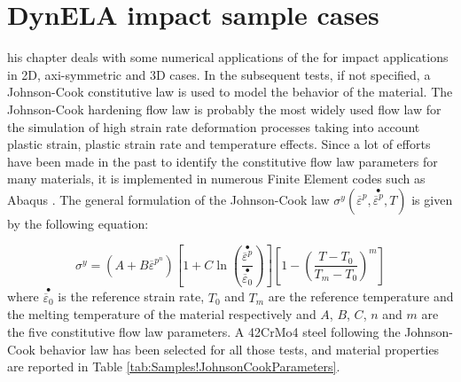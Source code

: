 %
%
%
\chapter{DynELA impact sample cases}

\startcontents[chapters]
\printmyminitoc[1]his chapter deals with some numerical applications of
the \DynELA for impact applications in 2D, axi-symmetric and 3D
cases. In the subsequent tests, if not specified, a Johnson-Cook constitutive
law is used to model the behavior of the material. The Johnson-Cook
hardening flow law is probably the most widely used flow law for the
simulation of high strain rate deformation processes taking into account
plastic strain, plastic strain rate and temperature effects. Since
a lot of efforts have been made in the past to identify the constitutive
flow law parameters for many materials, it is implemented in numerous
Finite Element codes such as Abaqus \cite{abaqus20146}. The general
formulation of the Johnson-Cook law $\sigma^{y}(\overline{\varepsilon}^{p},\stackrel{\bullet}{\overline{\varepsilon}^{p}},T)$
is given by the following equation:

\begin{equation}
\sigma^{y}=\left(A+B\overline{\varepsilon}^{p^{n}}\right)\left[1+C\ln\left(\frac{\stackrel{\bullet}{\overline{\varepsilon}^{p}}}{\stackrel{\bullet}{\overline{\varepsilon}_{0}}}\right)\right]\left[1-\left(\frac{T-T_{0}}{T_{m}-T_{0}}\right)^{m}\right]\label{eq:Samples!Johnson-Cook}
\end{equation}
where $\stackrel{\bullet}{\overline{\varepsilon}_{0}}$ is the reference
strain rate, $T_{0}$ and $T_{m}$ are the reference temperature and
the melting temperature of the material respectively and $A$, $B$,
$C$, $n$ and $m$ are the five constitutive flow law parameters.
A 42CrMo4 steel following the Johnson-Cook behavior law has been selected
for all those tests, and material properties are reported in Table
\ref{tab:Samples!JohnsonCookParameters}.

